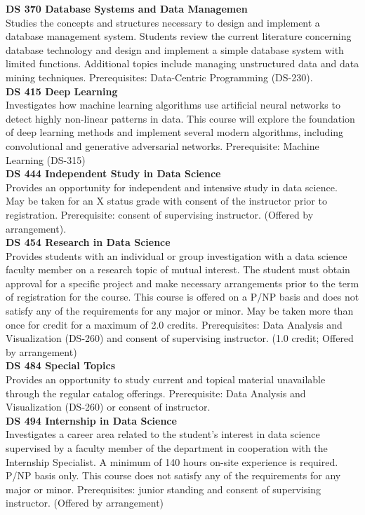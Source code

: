 \documentclass[
  letterpaper,
]{scrbook}
\begin{document}
\textbf{DS 370 Database Systems and Data Managemen}\\
Studies the concepts and structures necessary to design and implement a
database management system. Students review the current literature
concerning database technology and design and implement a simple
database system with limited functions. Additional topics include
managing unstructured data and data mining techniques. Prerequisites:
Data-Centric Programming (DS-230).\\
\textbf{DS 415 Deep Learning}\\
Investigates how machine learning algorithms use artificial neural
networks to detect highly non-linear patterns in data. This course will
explore the foundation of deep learning methods and implement several
modern algorithms, including convolutional and generative adversarial
networks. Prerequisite: Machine Learning (DS-315)\\
\textbf{DS 444 Independent Study in Data Science}\\
Provides an opportunity for independent and intensive study in data
science. May be taken for an X status grade with consent of the
instructor prior to registration. Prerequisite: consent of supervising
instructor. (Offered by arrangement).\\
\textbf{DS 454 Research in Data Science}\\
Provides students with an individual or group investigation with a data
science faculty member on a research topic of mutual interest. The
student must obtain approval for a specific project and make necessary
arrangements prior to the term of registration for the course. This
course is offered on a P/NP basis and does not satisfy any of the
requirements for any major or minor. May be taken more than once for
credit for a maximum of 2.0 credits. Prerequisites: Data Analysis and
Visualization (DS-260) and consent of supervising instructor. (1.0
credit; Offered by arrangement)\\
\textbf{DS 484 Special Topics}\\
Provides an opportunity to study current and topical material
unavailable through the regular catalog offerings. Prerequisite: Data
Analysis and Visualization (DS-260) or consent of instructor.\\
\textbf{DS 494 Internship in Data Science}\\
Investigates a career area related to the student's interest in data
science supervised by a faculty member of the department in cooperation
with the Internship Specialist. A minimum of 140 hours on-site
experience is required. P/NP basis only. This course does not satisfy
any of the requirements for any major or minor. Prerequisites: junior
standing and consent of supervising instructor. (Offered by arrangement)
\end{document}
